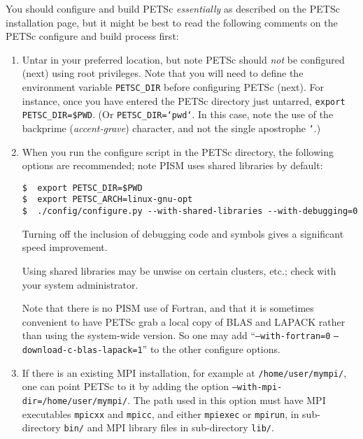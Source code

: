 \documentclass[titlepage,letterpaper,final]{scrartcl}
\begin{document}
\begin{enumerate}
You should configure and build PETSc \emph{essentially} as described on the
PETSc installation page, but it might be best to read the following comments on
the PETSc configure and build process first:

\renewcommand{\labelenumii}{(\roman{enumii})}\begin{enumerate}
\item Untar in your preferred location, but note PETSc should \emph{not} be
  configured (next) using root privileges. Note that you will need to define
  the environment variable \texttt{PETSC_DIR} before
  configuring PETSc (next). For instance, once you have entered the PETSc
  directory just untarred, \texttt{export PETSC_DIR=\$PWD}. (Or
  \texttt{PETSC_DIR=`pwd`}. In this case, note the use of the backprime
  (\emph{accent-grave}) character, and not the single apostrophe \texttt{'}.)

\item When you run the configure script in the PETSc directory, the following
  options are recommended; note PISM uses shared libraries by
  default:
\begin{verbatim}
$  export PETSC_DIR=$PWD
$  export PETSC_ARCH=linux-gnu-opt
$  ./config/configure.py --with-shared-libraries --with-debugging=0
\end{verbatim}

Turning off the inclusion of debugging code and symbols gives a significant speed improvement.

Using shared libraries may be unwise on certain clusters, etc.; check with your system administrator.

Note that there is no PISM use of Fortran, and that it is sometimes convenient to have PETSc grab a local copy of BLAS and LAPACK rather than using the system-wide version.  So one may add ``\texttt{--with-fortran=0} \texttt{--download-c-blas-lapack=1}'' to the other configure options.

\item If there is an existing MPI installation, for example at \texttt{/home/user/mympi/}, one can point PETSc to it by adding the option \texttt{--with-mpi-dir=/home/user/mympi/}.  The path used in this option must have MPI executables \texttt{mpicxx} and \texttt{mpicc}, and either \texttt{mpiexec} or \texttt{mpirun}, in sub-directory \texttt{bin/} and MPI library files in sub-directory \texttt{lib/}.


\end{enumerate}
\end{enumerate}
\end{document}
